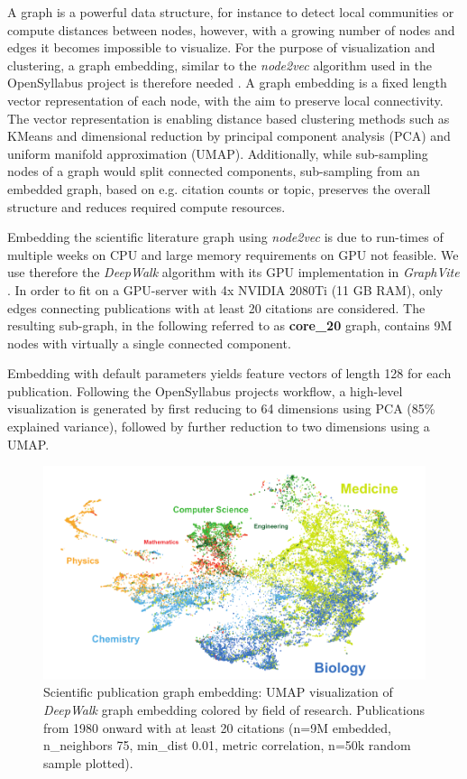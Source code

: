 A graph is a powerful data structure, for instance to detect local communities or compute distances between nodes, however, with a growing number of nodes and edges it becomes impossible to visualize.
For the purpose of visualization and clustering, a graph embedding, similar to the \textit{node2vec} algorithm used in the OpenSyllabus project is therefore needed \cite{Grover2016}.
A graph embedding is a fixed length vector representation of each node, with the aim to preserve local connectivity.
The vector representation is enabling distance based clustering methods such as KMeans and dimensional reduction by principal component analysis (PCA) and uniform manifold approximation (UMAP).
Additionally, while sub-sampling nodes of a graph would split connected components, sub-sampling from an embedded graph, based on e.g. citation counts or topic, preserves the overall structure and reduces required compute resources.

Embedding the scientific literature graph using \textit{node2vec} is due to run-times of multiple weeks on CPU and large memory requirements on GPU not feasible.
We use therefore the \textit{DeepWalk} \cite{Perozzi2014} algorithm with its GPU implementation in \textit{GraphVite} \cite{Zhu2019}.
In order to fit on a GPU-server with 4x NVIDIA 2080Ti (11 GB RAM), only edges connecting publications with at least 20 citations are considered.
The resulting sub-graph, in the following referred to as \textbf{core\_20} graph, contains 9M nodes with virtually a single connected component.

Embedding with default parameters yields feature vectors of length 128 for each publication.
Following the OpenSyllabus projects workflow, a high-level visualization is generated by first reducing to 64 dimensions using PCA (85\% explained variance), followed by further reduction to two dimensions using a UMAP.

\begin{figure}[h]
	\centering
	\includegraphics[width=1.0\textwidth]{figures/state_of_art/umap_global.pdf}
	\captionsetup{format=plain}
	\caption[Scientific literature graph]{Scientific publication graph embedding: UMAP visualization of \textit{DeepWalk} graph embedding colored by field of research. Publications from 1980 onward with at least 20 citations (n=9M embedded, n\_neighbors 75, min\_dist 0.01, metric correlation, n=50k random sample plotted).}
	\label{fig:state_of_art:umap_global}
\end{figure}




